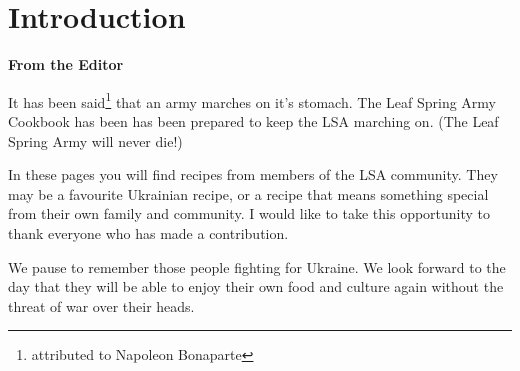 \documentclass[11pt]{book}
\begin{document}
\tableofcontents

\part{Introduction}

\textbf{From the Editor}

It has been said\footnote{attributed to Napoleon Bonaparte} that an army marches on it's stomach. 
The Leaf Spring Army Cookbook has been has been prepared to keep the 
LSA marching on. (The Leaf Spring Army will never die!)

In these pages you will find recipes from members of the LSA community. 
They may be a favourite Ukrainian recipe,
or a recipe that means something special from their own family and community.
I would like to take this opportunity to thank everyone who has made a contribution.

We pause to remember those people fighting for Ukraine. We look forward to the day that
they will be able to enjoy their own food and culture again without the threat of war
over their heads.
\end{document}

